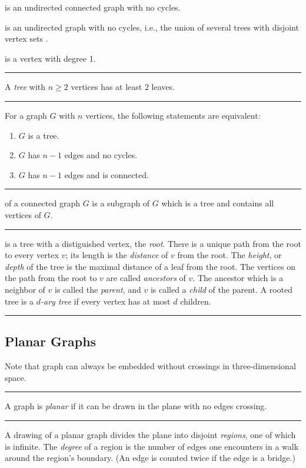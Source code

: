 \documentclass[a4paper]{extarticle}
\newcommand{\sep}{\vspace{5pt}\noindent\hrule\vspace{5pt}}
\begin{document}
\begin{multicols*}{2}
\Def[Tree] is an undirected connected graph with no cycles. 

\Def[Forest] is an undirected graph with no cycles, i.e., the union of several
trees with disjoint vertex sets . 

\Def[Leaf] is a vertex with degree 1. 

\sep

\Lem A \emph{tree} with $n\geq 2$ vertices has at least 2 leaves. 

\sep

 For a graph $G$ with $n$ vertices, the following
statements are equivalent:
\begin{enumerate}[label=(\alph*)]
  \item $G$ is a tree.
  \item $G$ has $n-1$ edges and no cycles.
  \item $G$ has $n-1$ edges and is connected.
\end{enumerate} 

\sep

 of a connected graph $G$ is a subgraph of $G$
which is a tree and contains all vertices of $G$. 

\sep

 is a tree with a distiguished vertex, the
\emph{root}. There is a unique path from the root to every vertex $v$; its
length is the \emph{distance} of $v$ from the root. The \emph{height}, or
\emph{depth} of the tree is the maximal distance of a leaf from the root. The
vertices on the path from the root to $v$ are called \emph{ancestors} of $v$.
The ancestor which is a neighbor of $v$ is called the \emph{parent}, and $v$ is
called a \emph{child} of the parent. A rooted tree is a \emph{$d$-ary tree} if
every vertex has at most $d$ children. 

\sep

\subsection{Planar Graphs}

Note that graph can always be embedded without crossings in three-dimensional
space.

\sep

\Def[Planarity] A graph is \emph{planar} if it can be drawn in the plane with no
edges crossing. 

\sep

 A drawing of a planar graph divides the plane into
disjoint \emph{regions}, one of which is infinite. The \emph{degree} of a region
is the number of edges one encounters in a walk around the region's boundary.
(An edge is counted twice if the edge is a bridge.)


\end{multicols*}
\end{document}
